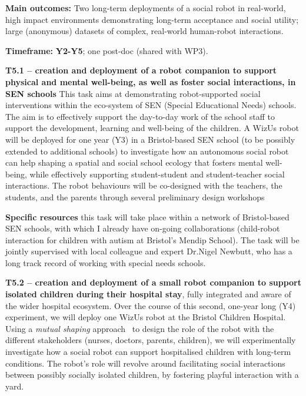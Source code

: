 \documentclass[11pt,a4paper]{report}
\newcommand{\project}{WizUs\xspace}
\begin{document}
\begin{framed}

    \textbf{Main outcomes:} Two long-term deployments of a social robot in
    real-world, high impact environments demonstrating long-term acceptance and
    social utility; large (anonymous) datasets of complex, real-world
    human-robot interactions.

    \textbf{Timeframe:} \textbf{Y2-Y5}; one post-doc (shared with WP3).

\end{framed}
\textbf{T5.1 -- creation and deployment of a robot companion to
support physical and mental well-being, as well as foster social interactions,
in SEN schools} This task aims at demonstrating robot-supported social
interventions within the eco-system of SEN (Special Educational Needs)
schools. The aim is to effectively support the day-to-day work of the
school staff to support the development, learning and well-being of the
children. A \project robot will be deployed for one year (Y3) in a
Bristol-based SEN school (to be possibly extended to additional schools) to
investigate how an autonomous social robot can help shaping a spatial and social
school ecology that fosters mental well-being, while effectively supporting
student-student and student-teacher social interactions. The
robot behaviours will be co-designed with the teachers, the students, and the
parents through several preliminary design workshops

\textbf{Specific resources} this task will take place within a network of
Bristol-based SEN schools, with which I already have on-going collaborations
(child-robot interaction for children with autism at Bristol's Mendip School).
The task will be jointly supervised with local colleague and expert Dr.Nigel Newbutt,
who has a long track record of working with special needs schools.


\textbf{T5.2 -- creation and deployment of a small robot companion to support
isolated children during their hospital stay}, fully integrated and aware of the
wider hospital ecosystem. Over the course of this second, one-year long (Y4)
experiment, we will deploy one \project robot at the Bristol Children Hospital.
Using a \emph{mutual shaping} approach~\cite{winkle2018social} to design the
role of the robot with the different stakeholders (nurses, doctors, parents,
children), we will experimentally investigate how a social robot can support
hospitalised children with long-term conditions. The robot's role will revolve
around facilitating social interactions between possibly socially isolated
children, by fostering playful interaction with a yard.
\end{document}
